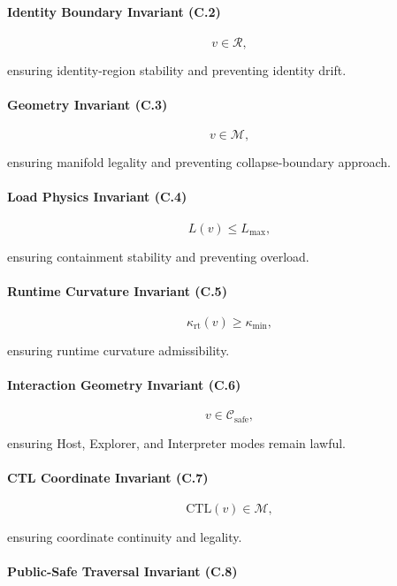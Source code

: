 \paragraph{Identity Boundary Invariant (C.2)}


\[
v \in \mathcal{R},
\]


ensuring identity-region stability and preventing identity drift.

\paragraph{Geometry Invariant (C.3)}


\[
v \in \mathcal{M},
\]


ensuring manifold legality and preventing collapse-boundary approach.

\paragraph{Load Physics Invariant (C.4)}


\[
L(v) \le L_{\max},
\]


ensuring containment stability and preventing overload.

\paragraph{Runtime Curvature Invariant (C.5)}


\[
\kappa_{\mathrm{rt}}(v) \ge \kappa_{\min},
\]


ensuring runtime curvature admissibility.

\paragraph{Interaction Geometry Invariant (C.6)}


\[
v \in \mathcal{C}_{\mathrm{safe}},
\]


ensuring Host, Explorer, and Interpreter modes remain lawful.

\paragraph{CTL Coordinate Invariant (C.7)}


\[
\mathrm{CTL}(v) \in \mathcal{M},
\]


ensuring coordinate continuity and legality.

\paragraph{Public-Safe Traversal Invariant (C.8)}



